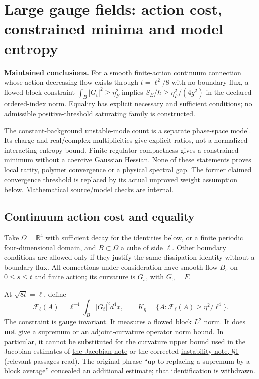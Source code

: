 \documentclass[11pt,a4paper]{article}
\begin{document}
\hypertarget{large-gauge-fields-action-cost-constrained-minima-and-model-entropy}{%
\section{Large gauge fields: action cost, constrained minima and model
entropy}\label{large-gauge-fields-action-cost-constrained-minima-and-model-entropy}}

\textbf{Maintained conclusions.} For a smooth finite-action continuum
connection whose action-decreasing flow exists through \(t=\ell^2/8\)
with no boundary flux, a flowed block constraint
\(\int_B|G_t|^2\ge\eta_F^2\) implies \(S_E/\hbar\ge\eta_F^2/(4g^2)\) in
the declared ordered-index norm. Equality has explicit necessary and
sufficient conditions; no admissible positive-threshold saturating
family is constructed.

The constant-background unstable-mode count is a separate phase-space
model. Its charge and real/complex multiplicities give explicit ratios,
not a normalized interacting entropy bound. Finite-regulator compactness
gives a constrained minimum without a coercive Gaussian Hessian. None of
these statements proves local rarity, polymer convergence or a physical
spectral gap. The former claimed convergence threshold is replaced by
its actual unproved weight assumption below. Mathematical source/model
checks are internal.

\hypertarget{continuum-action-cost-and-equality}{%
\subsection{Continuum action cost and
equality}\label{continuum-action-cost-and-equality}}

Take \(\Omega=\mathbb R^4\) with sufficient decay for the identities
below, or a finite periodic four-dimensional domain, and
\(B\subset\Omega\) a cube of side \(\ell\). Other boundary conditions
are allowed only if they justify the same dissipation identity without a
boundary flux. All connections under consideration have smooth flow
\(B_s\) on \(0\le s\le t\) and finite action; its curvature is \(G_s\),
with \(G_0=F\).

At \(\sqrt{8t}=\ell\), define
\[\mathcal F_\ell(A)=\ell^{-4}\int_B|G_t|^2d^4x,
\qquad K_\eta=\{A:\mathcal F_\ell(A)\ge\eta^2/\ell^4\}.\] The constraint
is gauge invariant. It measures a flowed block \(L^2\) norm. It does
\textbf{not} give a supremum or an adjoint-curvature operator norm
bound. In particular, it cannot be substituted for the curvature upper
bound used in the Jacobian estimates of
\href{flow-jacobian-truncation-error.md}{the Jacobian note} or the
corrected
\href{flow-jacobian-truncation-error.md\#instability-of-the-full-background-generator}{instability
note, §1} (relevant passages read). The original phrase ``up to
replacing a supremum by a block average'' concealed an additional
estimate; that identification is withdrawn.
\end{document}
